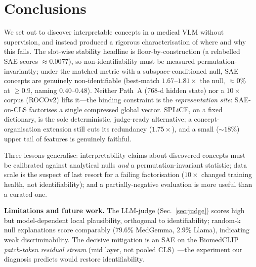 \documentclass[sigconf, nonacm]{acmart}
\begin{document}
\section{Conclusions}
We set out to discover interpretable concepts in a medical VLM without supervision, and instead produced a rigorous characterisation of where and why this fails. The slot-wise stability headline is floor-by-construction (a relabelled SAE scores ${\approx}0.0077$), so non-identifiability must be measured permutation-invariantly; under the matched metric with a subspace-conditioned null, SAE concepts are genuinely non-identifiable (best-match $1.67$--$1.81{\times}$ the null, ${\approx}0\%$ at $\geq0.9$, naming $0.40$--$0.48$). Neither Path~A (768-d hidden state) nor a $10{\times}$ corpus (ROCOv2) lifts it---the binding constraint is the \emph{representation site}: SAE-on-CLS factorises a single compressed global vector. SPLiCE, on a fixed dictionary, is the sole deterministic, judge-ready alternative; a concept-organisation extension still cuts its redundancy ($1.75{\times}$), and a small (${\sim}18\%$) upper tail of features is genuinely faithful.

Three lessons generalise: interpretability claims about discovered concepts must be calibrated against analytical nulls \emph{and} a permutation-invariant statistic; data scale is the suspect of last resort for a failing factorisation ($10{\times}$ changed training health, not identifiability); and a partially-negative evaluation is more useful than a curated one.

\textbf{Limitations and future work.} The LLM-judge (Sec.~\ref{sec:judge}) scores high but model-dependent local plausibility, orthogonal to identifiability; random-k null explanations score comparably ($79.6\%$ MedGemma, $2.9\%$ Llama), indicating weak discriminability. The decisive mitigation is an SAE on the BiomedCLIP \emph{patch-token residual stream} (mid layer, not pooled CLS)~\cite{bricken2023monosemanticity}---the experiment our diagnosis predicts would restore identifiability.



\end{document}
